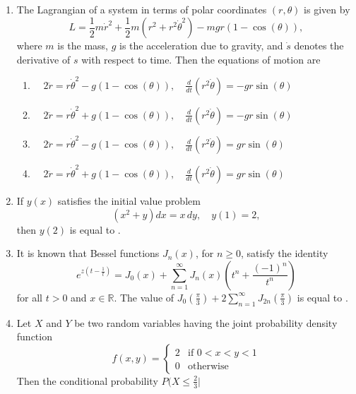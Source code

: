 \documentclass[journal]{IEEEtran}
\numberwithin{equation}{enumi}
\numberwithin{figure}{enumi}
\begin{document}
\begin{enumerate}
    \bigskip

    \item The Lagrangian of a system in terms of polar coordinates $(r, \theta)$ is given by
    \[
    L = \frac{1}{2} m \dot{r}^2 + \frac{1}{2} m \left( r^2 + r^2 \dot{\theta}^2 \right) - m g r \left( 1 - \cos(\theta) \right),
    \]
    where $m$ is the mass, $g$ is the acceleration due to gravity, and $\dot{s}$ denotes the derivative of $s$ with respect to time. Then the equations of motion are
    \begin{enumerate}
        \item $ \quad 2 \ddot{r} = r \dot{\theta}^2 - g \left( 1 - \cos(\theta) \right), \quad \frac{d}{dt} \left( r^2 \dot{\theta} \right) = - g r \sin(\theta)$
        \item $ \quad 2 \ddot{r} = r \dot{\theta}^2 + g \left( 1 - \cos(\theta) \right), \quad \frac{d}{dt} \left( r^2 \dot{\theta} \right) = - g r \sin(\theta)$
        \item $ \quad 2 \ddot{r} = r \dot{\theta}^2 - g \left( 1 - \cos(\theta) \right), \quad \frac{d}{dt} \left( r^2 \dot{\theta} \right) = g r \sin(\theta)$
        \item $ \quad 2 \ddot{r} = r \dot{\theta}^2 + g \left( 1 - \cos(\theta) \right), \quad \frac{d}{dt} \left( r^2 \dot{\theta} \right) = g r \sin(\theta)$
    \end{enumerate}

    \bigskip

    \item If $y(x)$ satisfies the initial value problem 
    \[
    (x^2 + y) dx = x \, dy, \quad y(1) = 2,
    \]
    then $y(2)$ is equal to \underline{\hspace{1cm}}.
    
    \bigskip

    \item It is known that Bessel functions $J_n(x)$, for $n \geq 0$, satisfy the identity
    \[
    e^{z \left( t - \frac{1}{t} \right)} = J_0(x) + \sum_{n=1}^\infty J_n(x) \left( t^n + \frac{(-1)^n}{t^n} \right)
    \]
    for all $t > 0$ and $x \in \mathbb{R}$. The value of $J_0 \left( \frac{\pi}{3} \right) + 2 \sum_{n=1}^\infty J_{2n} \left( \frac{\pi}{3} \right)$ is equal to \underline{\hspace{1cm}}.
    
    \bigskip

    \item Let $X$ and $Y$ be two random variables having the joint probability density function
    \[
    f(x,y) = \begin{cases}
        2 & \text{if } 0 < x < y < 1 \\
        0 & \text{otherwise}
    \end{cases}
    \]
    Then the conditional probability $P ( X \leq \frac{2}{3}|$

\end{enumerate}
\end{document}

